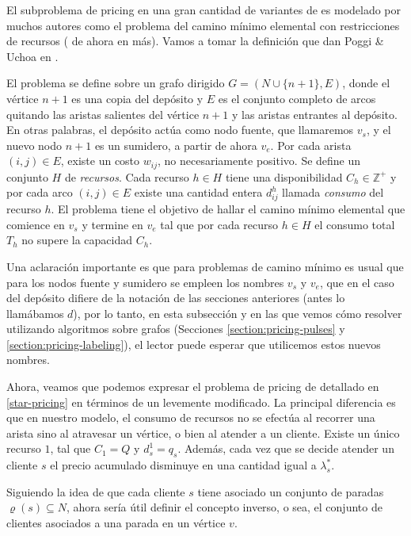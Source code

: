 El subproblema de pricing en una gran cantidad de variantes de  es modelado por muchos autores como el problema del camino mínimo elemental con restricciones de recursos ( de ahora en más). Vamos a tomar la definición que dan Poggi \& Uchoa en \cite{poggi-uchoa}. 

El problema se define sobre un grafo dirigido $G = (N \cup \{n+1\}, E)$, donde el vértice $n+1$ es una copia del depósito y $E$ es el conjunto completo de arcos quitando las aristas salientes del vértice $n+1$ y las aristas entrantes al depósito. En otras palabras, el depósito actúa como nodo fuente, que llamaremos $v_s$, y el nuevo nodo $n+1$ es un sumidero, a partir de ahora $v_e$. Por cada arista $(i, j) \in E$, existe un costo $w_{ij}$, no necesariamente positivo. Se define un conjunto $H$ de \emph{recursos}. Cada recurso $h \in H$ tiene una disponibilidad $C_h \in \mathbb{Z}^{+}$ y por cada arco $(i, j) \in E$ existe una cantidad entera $d_{ij}^{h}$ llamada \emph{consumo} del recurso $h$. El problema  tiene el objetivo de hallar el camino mínimo elemental que comience en $v_s$ y termine en $v_e$ tal que por cada recurso $h \in H$ el consumo total $T_h$ no supere la capacidad $C_h$. 

Una aclaración importante es que para problemas de camino mínimo es usual que para los nodos fuente y sumidero se empleen los nombres $v_s$ y $v_e$, que en el caso del depósito difiere de la notación de las secciones anteriores (antes lo llamábamos $d$), por lo tanto, en esta subsección y en las que vemos cómo resolver  utilizando algoritmos sobre grafos (Secciones \ref{section:pricing-pulses} y \ref{section:pricing-labeling}), el lector puede esperar que utilicemos estos nuevos nombres.

Ahora, veamos que podemos expresar el problema de pricing de  detallado en \ref{star-pricing} en términos de un  levemente modificado. La principal diferencia es que en nuestro modelo, el consumo de recursos no se efectúa al recorrer una arista sino al atravesar un vértice, o bien al atender a un cliente. Existe un único recurso $1$, tal que $C_1 = Q$ y $d_{s}^{1} = q_s$. Además, cada vez que se decide atender un cliente $s$ el precio acumulado disminuye en una cantidad igual a $\lambda^{*}_s$.

Siguiendo la idea de que cada cliente $s$ tiene asociado un conjunto de paradas $\varrho(s) \subseteq N$, ahora sería útil definir el concepto inverso, o sea, el conjunto de clientes asociados a una parada en un vértice $v$.

